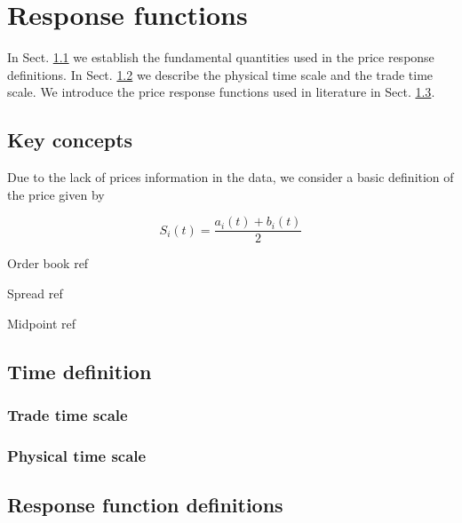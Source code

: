 \section{Response functions}\label{sec:response_functions_def}

In Sect. \ref{subsec:key_concepts} we establish the fundamental quantities used
in the price response definitions. In Sect. \ref{subsec:time_definition} we
describe the physical time scale and the trade time scale. We introduce the
price response functions used in literature in Sect. \ref{subsec:response_def}.

\subsection{Key concepts}\label{subsec:key_concepts}


Due to the lack of prices information in the data, we consider a basic definition
of the price given by \cite{patterns_forex,political_forex}

\begin{equation}
    S_{i} \left(t\right) = \frac{a_{i}\left(t\right) + b_{i}\left(t\right)}{2}
\end{equation}

Order book ref \cite{forex_structure}

Spread ref \cite{teach_spread}

Midpoint ref \cite{teach_spread}

\subsection{Time definition}\label{subsec:time_definition}

\subsubsection{Trade time scale}\label{subsubsec:trade_time}

\subsubsection{Physical time scale}\label{subsubsec:physical_time}

\subsection{Response function definitions}\label{subsec:response_def}